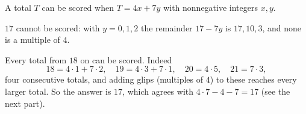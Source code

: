 A total $T$ can be scored when $T=4x+7y$ with nonnegative integers $x,y$.

$17$ cannot be scored: with $y=0,1,2$ the remainder $17-7y$ is $17,10,3$, and none is a multiple of $4$.

Every total from $18$ on can be scored. Indeed
\[
18=4\cdot1+7\cdot2,\quad 19=4\cdot3+7\cdot1,\quad 20=4\cdot5,\quad 21=7\cdot3,
\]
four consecutive totals, and adding glips (multiples of $4$) to these reaches every larger total. So the answer is $\boxed{17}$, which agrees with $4\cdot7-4-7=17$ (see the next part).
